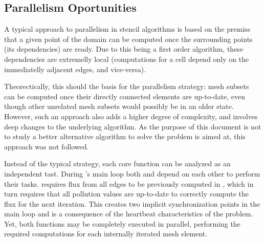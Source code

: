 \subsection{Parallelism Oportunities}
\label{sec:220}


A typical approach to parallelism in stencil algorithms is based on the premiss that a given point of the domain can be computed once the surrounding points (its dependencies) are ready.
Due to this being a first order algorithm, these dependencies are extremelly local (computations for a cell depend only on the immediatelly adjacent edges, and vice-versa).

Theorectically, this should the basis for the parallelism strategy: mesh subsets can be computed once their directly connected elements are up-to-date, even though other unrelated mesh subsets would possibly be in an older state.
However, such an approach also adds a higher degree of complexity, and involves deep changes to the underlying algorithm.
As the purpose of this document is not to study a better alternative algorithm to solve the problem \polu is aimed at, this approach was not followed.

Instead of the typical strategy, each core function can be analyzed as an independent tast. During \polu's main loop both \computeflux and \update depend on each other to perform their tasks. \update requires flux from all edges to be previously computed in \computeflux, which in turn requires that all pollution values are up-to-date to correctly compute the flux for the next iteration. This creates two implicit synchronization points in the main loop and is a consequence of the heartbeat characteristics of the problem. Yet, both functions may be completely executed in parallel, performing the required computations for each internally iterated mesh element.
